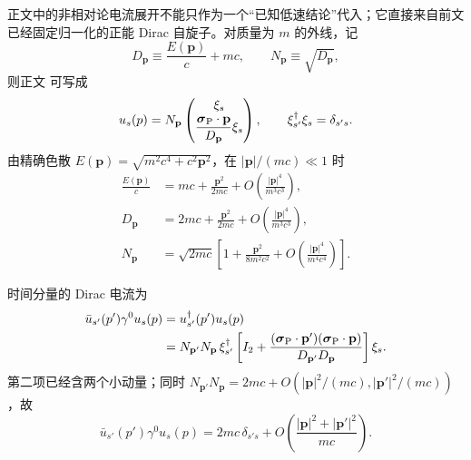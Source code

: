\begin{derivation}
正文中的非相对论电流展开不能只作为一个“已知低速结论”代入；它直接来自前文已经固定归一化的正能 Dirac 自旋子。对质量为 $m$ 的外线，记
\begin{equation*}
 D_{\mathbf p}\equiv \frac{E(\mathbf p)}{c}+mc,
 \qquad
 N_{\mathbf p}\equiv\sqrt{D_{\mathbf p}},
\end{equation*}
则正文 可写成
\begin{equation*}
 u_s(p)=N_{\mathbf p}
 \begin{pmatrix}
 \xi_s\\[1mm]
 \dfrac{\boldsymbol\sigma_{\rm P}\cdot\mathbf p}{D_{\mathbf p}}\xi_s
 \end{pmatrix},
 \qquad
 \xi_{s'}^\dagger\xi_s=\delta_{s's}.
\end{equation*}
由精确色散
$E(\mathbf p)=\sqrt{m^2c^4+c^2\mathbf p^2}$，在
$|\mathbf p|/(mc)\ll1$ 时
\begin{align*}
 \frac{E(\mathbf p)}{c}
 &=mc+\frac{\mathbf p^2}{2mc}
 +O\!\left(\frac{|\mathbf p|^4}{m^3c^3}\right),\\
 D_{\mathbf p}
 &=2mc+\frac{\mathbf p^2}{2mc}
 +O\!\left(\frac{|\mathbf p|^4}{m^3c^3}\right),\\
 N_{\mathbf p}
 &=\sqrt{2mc}\left[
 1+\frac{\mathbf p^2}{8m^2c^2}
 +O\!\left(\frac{|\mathbf p|^4}{m^4c^4}\right)
 \right].
\end{align*}

时间分量的 Dirac 电流为
\begin{align*}
 \bar u_{s'}(p')\gamma^0u_s(p)
 &=u_{s'}^\dagger(p')u_s(p)\\
 &=N_{\mathbf p'}N_{\mathbf p}\,
 \xi_{s'}^\dagger\left[
 I_2+
 \frac{(\boldsymbol\sigma_{\rm P}\cdot\mathbf p')
       (\boldsymbol\sigma_{\rm P}\cdot\mathbf p)}
 {D_{\mathbf p'}D_{\mathbf p}}
 \right]\xi_s.
\end{align*}
第二项已经含两个小动量；同时
$N_{\mathbf p'}N_{\mathbf p}=2mc+O(|\mathbf p|^2/(mc),|\mathbf p'|^2/(mc))$，故
\begin{equation*}
 \boxed{
 \bar u_{s'}(p')\gamma^0u_s(p)
 =2mc\,\delta_{s's}
 +O\!\left(\frac{|\mathbf p|^2+|\mathbf p'|^2}{mc}\right).}
\end{equation*}


\end{derivation}
